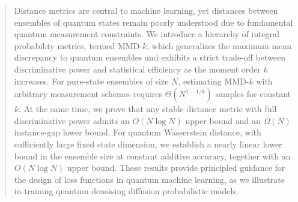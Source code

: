 \documentclass[aps,prx,reprint,superscriptaddress,amsmath,amssymb,longbibliography,floatfix]{revtex4-2}
\theoremstyle{plain}
\theoremstyle{definition}
\theoremstyle{remark}
\begin{document}
\begin{abstract}






Distance metrics are central to machine learning, yet distances between ensembles of quantum states remain poorly understood due to fundamental quantum measurement constraints. We introduce a hierarchy of integral probability metrics, termed MMD-$k$, which generalizes the maximum mean discrepancy to quantum ensembles and exhibits a strict trade-off between discriminative power and statistical efficiency as the moment order $k$ increases. For pure-state ensembles of size $N$, estimating MMD-$k$ with arbitrary measurement schemes requires $\Theta(N^{1-1/k})$ samples for constant $k$. At the same time, we prove that any stable distance metric with full discriminative power admits an $O(N\log N)$ upper bound and an $\Omega(N)$ instance-gap lower bound. For quantum Wasserstein distance, with sufficiently large fixed state dimension, we establish a nearly linear lower bound in the ensemble size at constant additive accuracy, together with an $O(N\log N)$ upper bound. These results provide principled guidance for the design of loss functions in quantum machine learning, as we illustrate in training quantum denoising diffusion probabilistic models.


\end{abstract}
\end{document}
